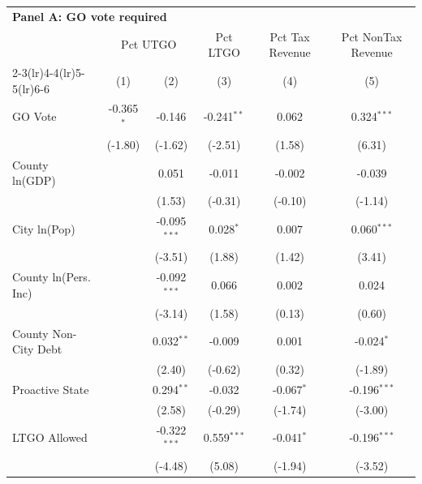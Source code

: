 \begingroup
\centering
\begin{tabular*}{\textwidth}{@{\extracolsep{\fill}}lccccc}
\multicolumn{5}{l}{\textbf{Panel A: GO vote required}}\\

\addlinespace
   \toprule
    & \multicolumn{2}{c}{Pct UTGO} & Pct LTGO & Pct Tax Revenue & Pct NonTax Revenue\\
   \cmidrule(lr){2-3}\cmidrule(lr){4-4}\cmidrule(lr){5-5}\cmidrule(lr){6-6}
                        & (1)          & (2)            & (3)           & (4)          & (5)\\  
   \midrule 
   GO Vote              & -0.365$^{*}$ & -0.146         & -0.241$^{**}$ & 0.062        & 0.324$^{***}$\\   
                        & (-1.80)     & (-1.62)       & (-2.51)      & (1.58)      & (6.31)\\   
   County ln(GDP)       &              & 0.051          & -0.011        & -0.002       & -0.039\\   
                        &              & (1.53)        & (-0.31)      & (-0.10)     & (-1.14)\\   
   City ln(Pop)         &              & -0.095$^{***}$ & 0.028$^{*}$   & 0.007        & 0.060$^{***}$\\   
                        &              & (-3.51)       & (1.88)       & (1.42)      & (3.41)\\   
   County ln(Pers. Inc) &              & -0.092$^{***}$ & 0.066         & 0.002        & 0.024\\   
                        &              & (-3.14)       & (1.58)       & (0.13)      & (0.60)\\   
   County Non-City Debt &              & 0.032$^{**}$   & -0.009        & 0.001        & -0.024$^{*}$\\   
                        &              & (2.40)        & (-0.62)      & (0.32)      & (-1.89)\\   
   Proactive State      &              & 0.294$^{**}$   & -0.032        & -0.067$^{*}$ & -0.196$^{***}$\\   
                        &              & (2.58)        & (-0.29)      & (-1.74)     & (-3.00)\\   
   LTGO Allowed         &              & -0.322$^{***}$ & 0.559$^{***}$ & -0.041$^{*}$ & -0.196$^{***}$\\   
                        &              & (-4.48)       & (5.08)       & (-1.94)     & (-3.52)\\   

\end{tabular*}
